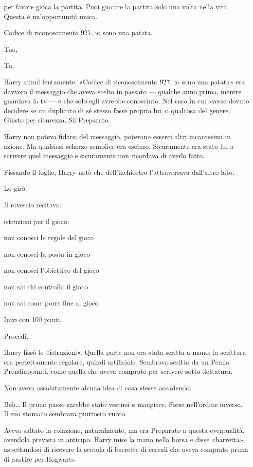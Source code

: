 per favore gioca la partita. Puoi giocare la partita solo una volta nella vita. Questa è un’opportunità unica.

Codice di riconoscimento 927, io sono una patata.

Tuo,

Tu.

Harry annuì lentamente. «Codice di riconoscimento 927, io sono una patata» era davvero il messaggio che aveva scelto in passato — qualche anno prima, mentre guardava la tv — e che solo egli avrebbe conosciuto. Nel caso in cui avesse dovuto decidere se un duplicato di sé stesso fosse proprio lui, o qualcosa del genere. Giusto per sicurezza. Sii Preparato.

Harry non poteva fidarsi del messaggio, potevano esserci altri incantesimi in azione. Ma qualsiasi scherzo semplice era escluso. Sicuramente era stato lui a scrivere quel messaggio e sicuramente non ricordava di averlo fatto.

Fissando il foglio, Harry notò che dell’inchiostro l’attraversava dall’altro lato.

Lo girò.

Il rovescio recitava:

istruzioni per il gioco:

non conosci le regole del gioco

non conosci la posta in gioco

non conosci l’obiettivo del gioco

non sai chi controlla il gioco

non sai come porre fine al gioco

Inizi con 100 punti.

Procedi.

Harry fissò le «istruzioni». Quella parte non era stata scritta a mano: la scrittura era perfettamente regolare, quindi artificiale. Sembrava scritta da un Penna Prendiappunti, come quella che aveva comprato per scrivere sotto dettatura.

Non aveva assolutamente alcuna idea di cosa stesse accadendo.

Beh… Il primo passo sarebbe stato vestirsi e mangiare. Forse nell’ordine inverso. Il suo stomaco sembrava piuttosto vuoto.

Aveva saltato la colazione, naturalmente, ma era Preparato a questa eventualità, avendola prevista in anticipo. Harry mise la mano nella borsa e disse «barretta», aspettandosi di ricevere la scatola di barrette di cereali che aveva comprato prima di partire per Hogwarts.

